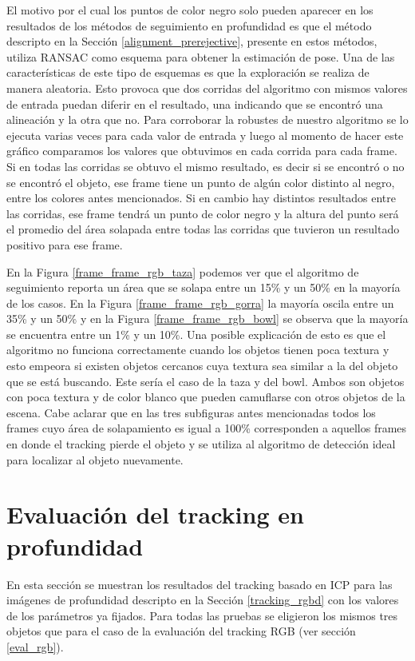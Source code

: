 El motivo por el cual los puntos de color negro solo pueden aparecer en los resultados de los métodos de seguimiento en profundidad es que el método descripto en la Sección \ref{alignment_prerejective}, presente en estos métodos, utiliza RANSAC como esquema para obtener la estimación de pose. Una de las características de este tipo de esquemas es que la exploración se realiza de manera aleatoria. Esto provoca que dos corridas del algoritmo con mismos valores de entrada puedan diferir en el resultado, una indicando que se encontró una alineación y la otra que no. Para corroborar la robustes de nuestro algoritmo se lo ejecuta varias veces para cada valor de entrada y luego al momento de hacer este gráfico comparamos los valores que obtuvimos en cada corrida para cada frame. Si en todas las corridas se obtuvo el mismo resultado, es decir si se encontró o no se encontró el objeto, ese frame tiene un punto de algún color distinto al negro, entre los colores antes mencionados. Si en cambio hay distintos resultados entre las corridas, ese frame tendrá un punto de color negro y la altura del punto será el promedio del área solapada entre todas las corridas que tuvieron un resultado positivo para ese frame.


En la Figura \ref{frame_frame_rgb_taza} podemos ver que el algoritmo de seguimiento reporta un área que se solapa entre un 15\% y un 50\% en la mayoría de los casos. En la Figura \ref{frame_frame_rgb_gorra} la mayoría oscila entre un 35\% y un 50\% y en la Figura \ref{frame_frame_rgb_bowl} se observa que la mayoría se encuentra entre un 1\% y un 10\%. Una posible explicación de esto es que el algoritmo no funciona correctamente cuando los objetos tienen poca textura y esto empeora si existen objetos cercanos cuya textura sea similar a la del objeto que se está buscando. Este sería el caso de la taza y del bowl. Ambos son objetos con poca textura y de color blanco que pueden camuflarse con otros objetos de la escena.
Cabe aclarar que en las tres subfiguras antes mencionadas todos los frames cuyo área de solapamiento es igual a 100\% corresponden a aquellos frames en donde el tracking pierde el objeto y se utiliza al algoritmo de detección ideal para localizar al objeto nuevamente.

\section{Evaluación del tracking en profundidad}
En esta sección se muestran los resultados del tracking basado en ICP para las imágenes de profundidad descripto en la Sección \ref{tracking_rgbd} con los valores de los parámetros ya fijados. Para todas las pruebas se eligieron los mismos tres objetos que para el caso de la evaluación del tracking RGB (ver sección \ref{eval_rgb}).

